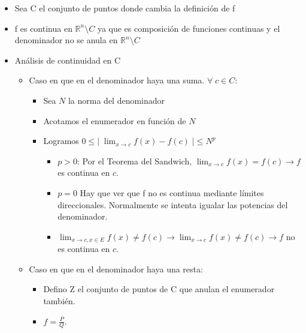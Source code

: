 \documentclass[twoside]{article}
\newcommand{\all}{\forall \;}
\newcommand{\dlim}{\displaystyle\lim}
\begin{document}
\begin{itemize}

\item Sea C el conjunto de puntos donde cambia la definición de f

\item f es continua en $\mathbb{R}^n \setminus C$ ya que es composición de funciones continuas y el denominador no se anula en $\mathbb{R}^n \setminus C$

\item Análisis de continuidad en C

\begin{itemize}
\item Caso en que en el denominador haya una suma. $\all c \in C$:

\begin{itemize}

\item Sea $N$ la norma del denominador

\item Acotamos el enumerador en función de $N$

\item Logramos $0 \leq |\; \dlim_{x \rightarrow c} f(x) - f(c) \; | \leq N^p$

\begin{itemize}
\item $p >0$: Por el Teorema del Sandwich, $\dlim_{x \rightarrow c} f(x) = f(c) \rightarrow f$ es continua en $c$.

\item $p=0$ Hay que ver que f no es continua mediante límites direccionales. Normalmente se intenta igualar las potencias del denominador.

\item $\dlim_{x \rightarrow c, x \in E} f(x) \neq f(c) \rightarrow \dlim_{x \rightarrow c} f(x) \neq f(c) \rightarrow f$ no es continua en $c$.

\end{itemize} 
\end{itemize}

\item Caso en que en el denominador haya una resta:

\begin{itemize}

\item Defino Z el conjunto de puntos de C que anulan el enumerador también.

\item $f = \frac{P}{Q}$.


\end{itemize}
\end{itemize}
\end{itemize}
\end{document}
